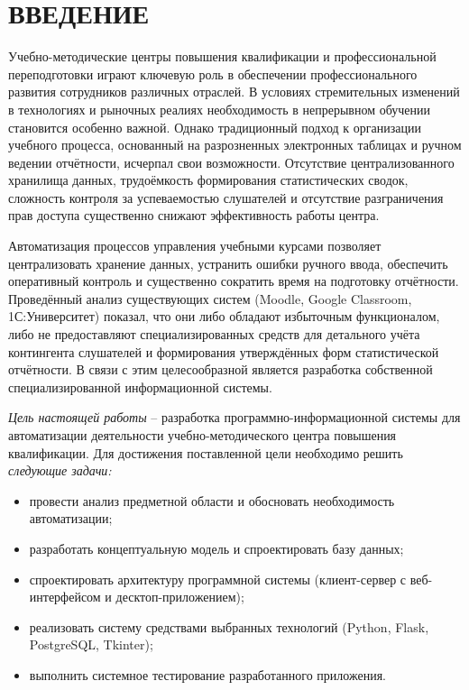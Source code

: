 \section*{ВВЕДЕНИЕ}

Учебно-методические центры повышения квалификации и профессиональной переподготовки играют ключевую роль в обеспечении профессионального развития сотрудников различных отраслей. В условиях стремительных изменений в технологиях и рыночных реалиях необходимость в непрерывном обучении становится особенно важной. Однако традиционный подход к организации учебного процесса, основанный на разрозненных электронных таблицах и ручном ведении отчётности, исчерпал свои возможности. Отсутствие централизованного хранилища данных, трудоёмкость формирования статистических сводок, сложность контроля за успеваемостью слушателей и отсутствие разграничения прав доступа существенно снижают эффективность работы центра.

Автоматизация процессов управления учебными курсами позволяет централизовать хранение данных, устранить ошибки ручного ввода, обеспечить оперативный контроль и существенно сократить время на подготовку отчётности. Проведённый анализ существующих систем (Moodle, Google Classroom, 1С:Университет) показал, что они либо обладают избыточным функционалом, либо не предоставляют специализированных средств для детального учёта контингента слушателей и формирования утверждённых форм статистической отчётности. В связи с этим целесообразной является разработка собственной специализированной информационной системы.

\emph{Цель настоящей работы} – разработка программно-информационной системы для автоматизации деятельности учебно-методического центра повышения квалификации. Для достижения поставленной цели необходимо решить \emph{следующие задачи:}
\begin{itemize}
	\item провести анализ предметной области и обосновать необходимость автоматизации;
	\item разработать концептуальную модель и спроектировать базу данных;
	\item спроектировать архитектуру программной системы (клиент-сервер с веб-интерфейсом и десктоп-приложением);
	\item реализовать систему средствами выбранных технологий (Python, Flask, PostgreSQL, Tkinter);
	\item выполнить системное тестирование разработанного приложения.
\end{itemize}

